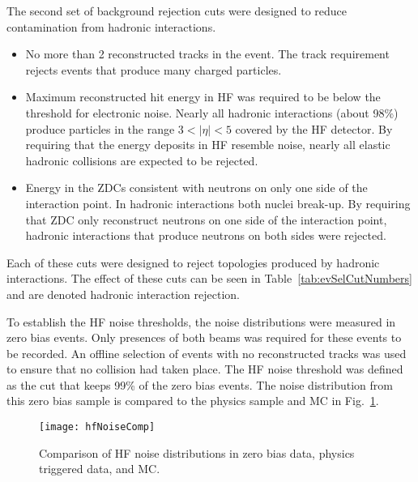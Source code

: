       The second set of background rejection cuts were designed to 
        reduce contamination from hadronic interactions. 
      \begin{itemize}
  	    \item No more than 2 reconstructed tracks in the event.
          The track requirement rejects events that produce many charged 
          particles.
  	    \item Maximum reconstructed hit energy in HF was required to be below 
            the threshold for electronic noise. 
          Nearly all hadronic interactions (about 98\%) produce particles in 
            the range $3<|\eta|<5$ covered by the HF detector.
          By requiring that the energy deposits in HF resemble noise, nearly all
            elastic hadronic collisions are expected to be rejected.
  	    \item Energy in the ZDCs consistent with neutrons on only one side 
            of the interaction point.
          In hadronic interactions both nuclei break-up. 
          By requiring that ZDC only reconstruct neutrons on one side of the 
            interaction point, hadronic interactions that produce neutrons on 
            both sides were rejected.
      \end{itemize}
      Each of these cuts were designed to reject topologies produced by 
        hadronic interactions.
      The effect of these cuts can be seen in Table~\ref{tab:evSelCutNumbers} 
        and are denoted hadronic interaction rejection. 

      To establish the HF noise thresholds, the noise distributions were 
        measured in zero bias events. 
      Only presences of both beams was required for these events to be recorded. 
      An offline selection of events with no reconstructed tracks was used
        to ensure that no collision had taken place. 
      The HF noise threshold was defined as the cut that keeps 99\% of the 
        zero bias events.
      The noise distribution from this zero bias sample is compared to the 
        physics sample and MC in Fig.~\ref{fig:hfNoiseDist}.

      \begin{figure}[!Hhbt]
        \centering
        \texttt{[image: hfNoiseComp]}
        \caption{Comparison of HF noise distributions in zero bias data, 
          physics triggered data, and MC.}
        \label{fig:hfNoiseDist}
      \end{figure}

